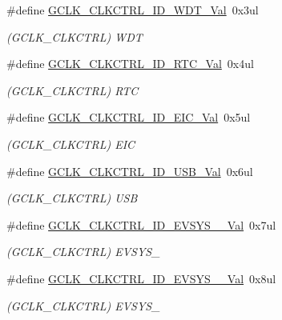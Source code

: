 \begin{DoxyCompactItemize}
\#define \mbox{\hyperlink{group___s_a_m_d21___g_c_l_k_gaf55824f940b869be173bf84b368d5107}{G\+C\+L\+K\+\_\+\+C\+L\+K\+C\+T\+R\+L\+\_\+\+I\+D\+\_\+\+W\+D\+T\+\_\+\+Val}}~0x3ul
\begin{DoxyCompactList}\small\item\em (G\+C\+L\+K\+\_\+\+C\+L\+K\+C\+T\+RL) W\+DT \end{DoxyCompactList}\item 
\#define \mbox{\hyperlink{group___s_a_m_d21___g_c_l_k_gaa79509ffa7f18da70d4ae344a3d3d70b}{G\+C\+L\+K\+\_\+\+C\+L\+K\+C\+T\+R\+L\+\_\+\+I\+D\+\_\+\+R\+T\+C\+\_\+\+Val}}~0x4ul
\begin{DoxyCompactList}\small\item\em (G\+C\+L\+K\+\_\+\+C\+L\+K\+C\+T\+RL) R\+TC \end{DoxyCompactList}\item 
\#define \mbox{\hyperlink{group___s_a_m_d21___g_c_l_k_gad482e84c3781695e980c8d1bcb9300f6}{G\+C\+L\+K\+\_\+\+C\+L\+K\+C\+T\+R\+L\+\_\+\+I\+D\+\_\+\+E\+I\+C\+\_\+\+Val}}~0x5ul
\begin{DoxyCompactList}\small\item\em (G\+C\+L\+K\+\_\+\+C\+L\+K\+C\+T\+RL) E\+IC \end{DoxyCompactList}\item 
\#define \mbox{\hyperlink{group___s_a_m_d21___g_c_l_k_ga5bff2fb927a4b63837aec5ea464ba61b}{G\+C\+L\+K\+\_\+\+C\+L\+K\+C\+T\+R\+L\+\_\+\+I\+D\+\_\+\+U\+S\+B\+\_\+\+Val}}~0x6ul
\begin{DoxyCompactList}\small\item\em (G\+C\+L\+K\+\_\+\+C\+L\+K\+C\+T\+RL) U\+SB \end{DoxyCompactList}\item 
\#define \mbox{\hyperlink{group___s_a_m_d21___g_c_l_k_ga24b8d07991d73b984d3ee5dbbfa43de1}{G\+C\+L\+K\+\_\+\+C\+L\+K\+C\+T\+R\+L\+\_\+\+I\+D\+\_\+\+E\+V\+S\+Y\+S\+\_\+\_\+\+Val}}~0x7ul
\begin{DoxyCompactList}\small\item\em (G\+C\+L\+K\+\_\+\+C\+L\+K\+C\+T\+RL) E\+V\+S\+Y\+S\+\_ \end{DoxyCompactList}\item 
\#define \mbox{\hyperlink{group___s_a_m_d21___g_c_l_k_ga33cf2ca39bd86e29c71d2d46e23419b5}{G\+C\+L\+K\+\_\+\+C\+L\+K\+C\+T\+R\+L\+\_\+\+I\+D\+\_\+\+E\+V\+S\+Y\+S\+\_\+\_\+\+Val}}~0x8ul
\begin{DoxyCompactList}\small\item\em (G\+C\+L\+K\+\_\+\+C\+L\+K\+C\+T\+RL) E\+V\+S\+Y\+S\+\_ \end{DoxyCompactList}\item 

\end{DoxyCompactItemize}
